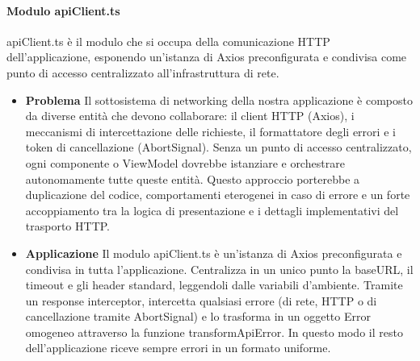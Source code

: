 \documentclass[11pt,a4paper]{article}
\begin{document}
\paragraph{Modulo apiClient.ts}
apiClient.ts è il modulo che si occupa della comunicazione HTTP dell'applicazione, esponendo un'istanza di Axios preconfigurata e condivisa come punto di accesso centralizzato all'infrastruttura di rete.
\begin{itemize}
\item \textbf{Problema} Il sottosistema di networking della nostra applicazione è composto da diverse entità che devono collaborare: il client HTTP (Axios), i meccanismi di intercettazione delle richieste, il formattatore degli errori e i token di cancellazione (AbortSignal). 
Senza un punto di accesso centralizzato, ogni componente o ViewModel dovrebbe istanziare e orchestrare autonomamente tutte queste entità. Questo approccio porterebbe a duplicazione del codice, comportamenti eterogenei in caso di errore e un forte accoppiamento tra la logica di presentazione e i dettagli implementativi del trasporto HTTP.
\item \textbf{Applicazione} Il modulo apiClient.ts è un'istanza di Axios preconfigurata e condivisa in tutta l'applicazione. Centralizza in un unico punto la baseURL, il timeout e gli header standard, leggendoli dalle variabili d'ambiente. Tramite un response interceptor, intercetta qualsiasi errore (di rete, HTTP o di cancellazione tramite AbortSignal) e lo trasforma in un oggetto Error omogeneo attraverso la funzione transformApiError. In questo modo il resto dell'applicazione riceve sempre errori in un formato uniforme.
\end{itemize}
\end{document}
